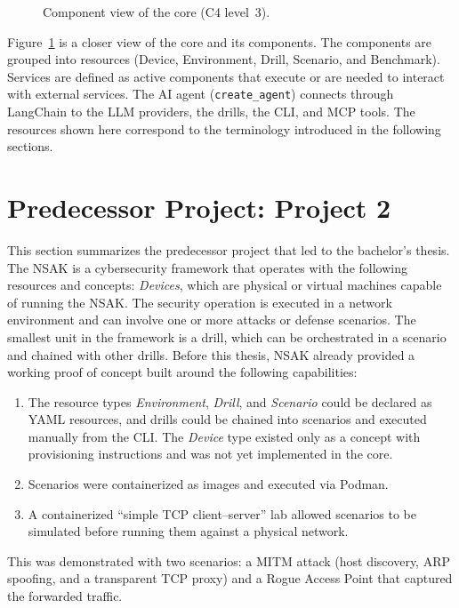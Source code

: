 \begin{figure}[H]
    \centering
    
    \caption{Component view of the  core (C4 level~3).}
    \label{fig:lean-core}
\end{figure}

Figure~\ref{fig:lean-core} is a closer view of the core and its components.
The components are grouped into resources (Device, Environment, Drill, Scenario, and Benchmark).
Services are defined as active components that execute or are needed to interact with external services.
The \gls{AI} agent (\texttt{create_agent}) connects through \gls{LangChain} to the \gls{LLM} providers, the drills, the \gls{CLI}, and \gls{MCP} tools.
The resources shown here correspond to the terminology introduced in the following sections.


\section{Predecessor Project: Project 2}\label{sec:predecessor-project-project-2}

This section summarizes the predecessor project that led to the bachelor's thesis.
The \gls{NSAK} is a cybersecurity framework that operates with the following resources and concepts:
\textit{Devices}, which are physical or virtual machines capable of running the \gls{NSAK}.
The security operation is executed in a network environment and can involve one or more attacks or defense scenarios.
The smallest unit in the framework is a drill, which can be orchestrated in a scenario and chained with other drills.
Before this thesis, \gls{NSAK} already provided a working proof of concept built around the following capabilities:
\begin{enumerate}
    \item The resource types \textit{Environment}, \textit{Drill}, and \textit{Scenario} could be declared as \gls{YAML} resources, and drills could be chained into scenarios and executed manually from the \gls{CLI}. The \textit{Device} type existed only as a concept with provisioning instructions and was not yet implemented in the core.
    \item Scenarios were containerized as  images and executed via \gls{Podman}.
    \item A containerized \enquote{simple TCP client--server} lab allowed scenarios to be simulated before running them against a physical network.
\end{enumerate}
This was demonstrated with two scenarios: a \gls{MITM} attack (host discovery, \gls{ARP} spoofing, and a transparent \gls{TCP} proxy) and a Rogue Access Point that captured the forwarded traffic.

